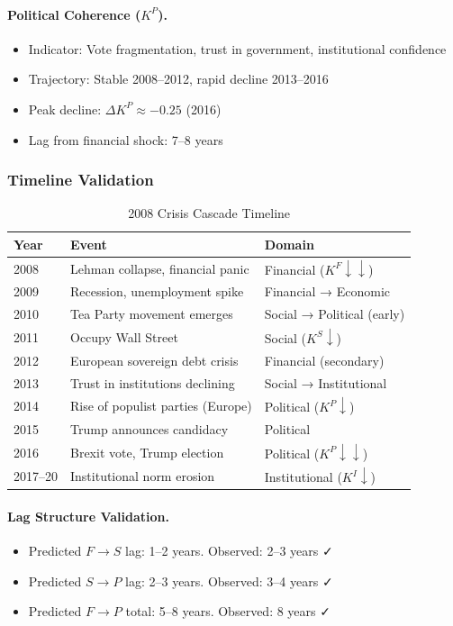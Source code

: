 \paragraph{Political Coherence ($K^P$).}
\begin{itemize}
    \item Indicator: Vote fragmentation, trust in government, institutional confidence
    \item Trajectory: Stable 2008--2012, rapid decline 2013--2016
    \item Peak decline: $\Delta K^P \approx -0.25$ (2016)
    \item Lag from financial shock: 7--8 years
\end{itemize}

\subsubsection{Timeline Validation}

\begin{table}[htbp]
\centering
\caption{2008 Crisis Cascade Timeline}
\label{tab:2008-timeline}
\small
\begin{tabular}{@{}lll@{}}
\toprule
\textbf{Year} & \textbf{Event} & \textbf{Domain} \\
\midrule
2008 & Lehman collapse, financial panic & Financial ($K^F \downarrow\downarrow$) \\
2009 & Recession, unemployment spike & Financial → Economic \\
2010 & Tea Party movement emerges & Social → Political (early) \\
2011 & Occupy Wall Street & Social ($K^S \downarrow$) \\
2012 & European sovereign debt crisis & Financial (secondary) \\
2013 & Trust in institutions declining & Social → Institutional \\
2014 & Rise of populist parties (Europe) & Political ($K^P \downarrow$) \\
2015 & Trump announces candidacy & Political \\
2016 & Brexit vote, Trump election & Political ($K^P \downarrow\downarrow$) \\
2017--20 & Institutional norm erosion & Institutional ($K^I \downarrow$) \\
\bottomrule
\end{tabular}
\end{table}

\paragraph{Lag Structure Validation.}
\begin{itemize}
    \item Predicted $F \to S$ lag: 1--2 years. Observed: 2--3 years ✓
    \item Predicted $S \to P$ lag: 2--3 years. Observed: 3--4 years ✓
    \item Predicted $F \to P$ total: 5--8 years. Observed: 8 years ✓
\end{itemize}

